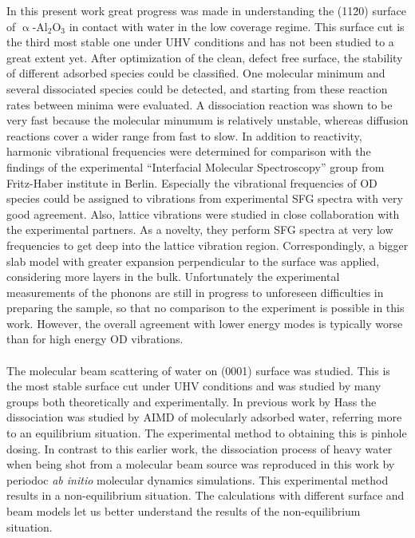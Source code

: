 \documentclass[11pt,DIV=13,BCOR=5mm,a4paper,headinclude]{scrbook}
\begin{document}

In this present work great progress was made in understanding the (11\=20) surface of $\upalpha$-Al$_2$O$_3$ in contact with water in the low coverage regime.
This surface cut is the third most stable one under UHV conditions and has not been studied to a great extent yet.
After optimization of the clean, defect free surface, the stability of different adsorbed species could be classified.
One molecular minimum and several dissociated species could be detected, and starting from these reaction rates between minima were evaluated.
A dissociation reaction was shown to be very fast because the molecular minumum is relatively unstable, whereas diffusion reactions cover a wider range from fast to slow.
In addition to reactivity, harmonic vibrational frequencies were determined for comparison with the findings of the experimental ``Interfacial Molecular Spectroscopy'' group  from Fritz-Haber institute in Berlin.
Especially the vibrational frequencies of OD species could be assigned to vibrations from experimental SFG spectra with very good agreement.
Also, lattice vibrations were studied in close collaboration with the experimental partners.
As a novelty, they perform SFG spectra at very low frequencies to get deep into the lattice vibration region.
Correspondingly, a bigger slab model with greater expansion perpendicular to the surface was applied, considering more layers in the bulk.
Unfortunately the experimental measurements of the phonons are still in progress to unforeseen difficulties in preparing the sample, so that no comparison to the experiment is possible in this work.
However, the overall agreement with lower energy modes is typically worse than for high energy OD vibrations.
\\\\
The molecular beam scattering of water on (0001) surface was studied.
This is the most stable surface cut under UHV conditions and was studied by many groups both theoretically and experimentally.
In previous work by Hass the dissociation was studied by AIMD of molecularly adsorbed water, referring more to an equilibrium situation.
The experimental method to obtaining this is pinhole dosing.
In contrast to this earlier work, the dissociation process of heavy water when being shot from a molecular beam source was reproduced in this work by periodoc \textit{ab initio} molecular dynamics simulations.
This experimental method results in a non-equilibrium situation.
The calculations with different surface and beam models let us better understand the results of the non-equilibrium situation.
\end{document}
